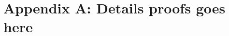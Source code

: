 \documentclass[TOCIMain]{subfiles}
\begin{document}
\section*{Appendix A: Details proofs goes here}
\end{document}
